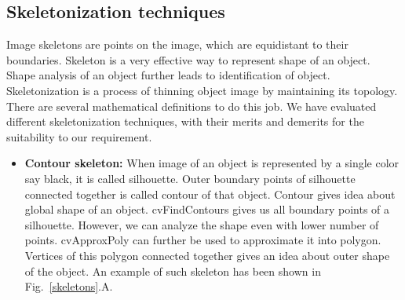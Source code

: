 \subsection{Skeletonization techniques}
\indent Image skeletons are points on the image, which are equidistant
to their boundaries.  Skeleton is a very effective way to represent
shape of an object.  Shape analysis of an object further leads to
identification of object.  Skeletonization is a process of thinning
object image by maintaining its topology. There are several mathematical
definitions to do this job. We have evaluated different skeletonization
techniques, with their merits and demerits for the suitability to our
requirement.
\begin{itemize}
\item \textbf{Contour skeleton:} When image of an object is represented by
	a single color say black, it is called silhouette. Outer boundary
	points of silhouette connected together is called contour of
	that object. Contour gives idea about global shape of an object.
	cvFindContours gives us all boundary points of a silhouette.
	However, we can analyze the shape even with lower number of
	points. cvApproxPoly can further be used to approximate it into
	polygon. Vertices of this polygon connected together gives an
	idea about outer shape of the object. An example of such
	skeleton has been shown in Fig.~\ref{skeletons}.A.


\end{itemize}
